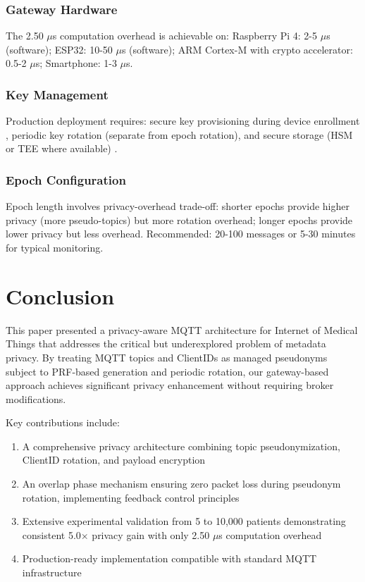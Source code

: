 \documentclass[conference]{IEEEtran}
\begin{document}
\subsubsection{Gateway Hardware}

The 2.50 $\mu$s computation overhead is achievable on: Raspberry Pi 4: 2-5 $\mu$s (software); ESP32: 10-50 $\mu$s (software); ARM Cortex-M with crypto accelerator: 0.5-2 $\mu$s; Smartphone: 1-3 $\mu$s.

\subsubsection{Key Management}

Production deployment requires: secure key provisioning during device enrollment \cite{blockchain_mqtt_auth, otp_auth_mqtt}, periodic key rotation (separate from epoch rotation), and secure storage (HSM or TEE where available) \cite{mqtt_trustzone}.

\subsubsection{Epoch Configuration}

Epoch length involves privacy-overhead trade-off: shorter epochs provide higher privacy (more pseudo-topics) but more rotation overhead; longer epochs provide lower privacy but less overhead. Recommended: 20-100 messages or 5-30 minutes for typical monitoring.

\section{Conclusion}

This paper presented a privacy-aware MQTT architecture for Internet of Medical Things that addresses the critical but underexplored problem of metadata privacy. By treating MQTT topics and ClientIDs as managed pseudonyms subject to PRF-based generation and periodic rotation, our gateway-based approach achieves significant privacy enhancement without requiring broker modifications.

Key contributions include:
\begin{enumerate}
    \item A comprehensive privacy architecture combining topic pseudonymization, ClientID rotation, and payload encryption
    \item An overlap phase mechanism ensuring zero packet loss during pseudonym rotation, implementing feedback control principles
    \item Extensive experimental validation from 5 to 10,000 patients demonstrating consistent 5.0$\times$ privacy gain with only 2.50 $\mu$s computation overhead
    \item Production-ready implementation compatible with standard MQTT infrastructure
\end{enumerate}
\end{document}
